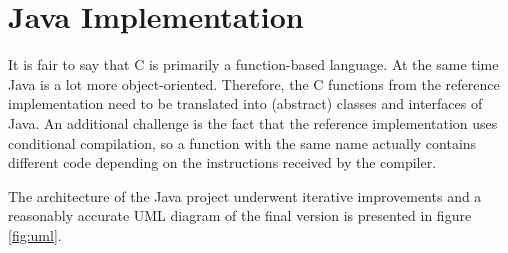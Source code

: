 \section{Java Implementation}
\label{sec:java-implementation}

It is fair to say that C is primarily a function-based language. At the same time Java is a lot more object-oriented. Therefore, the C functions from the reference implementation need to be translated into (abstract) classes and interfaces of Java. An additional challenge is the fact that the reference implementation uses conditional compilation, so a function with the same name actually contains different code depending on the instructions received by the compiler.

The architecture of the Java project underwent iterative improvements and a reasonably accurate UML diagram of the final version is presented in figure \ref{fig:uml}.


